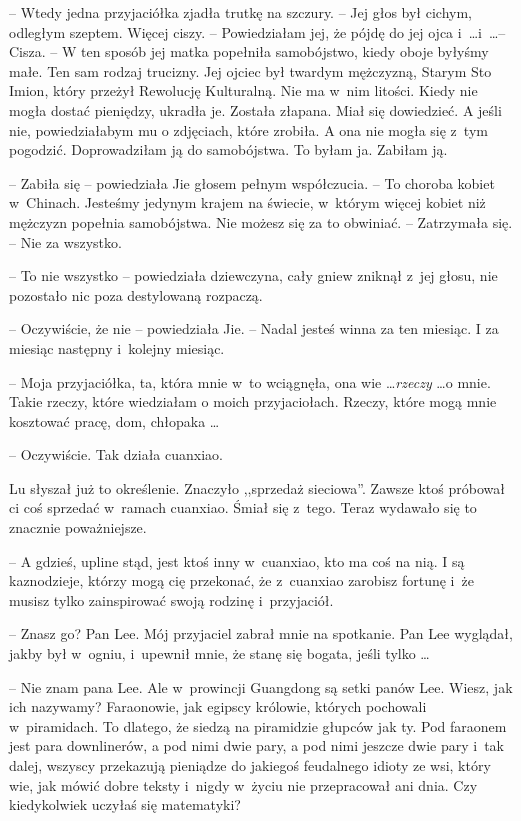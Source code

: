 \documentclass[oneside,polish,11pt,rmheadings]{mwbk}
\begin{document}
-- Wtedy jedna przyjaciółka zjadła trutkę na szczury. -- Jej głos był cichym, odległym szeptem. Więcej ciszy. -- Powiedziałam jej, że pójdę do jej ojca i~\ldots  i~\ldots  -- Cisza. -- W ten sposób jej matka popełniła samobójstwo, kiedy oboje byłyśmy małe. Ten sam rodzaj trucizny. Jej ojciec był twardym mężczyzną, Starym Sto Imion, który przeżył Rewolucję Kulturalną. Nie ma w~nim litości. Kiedy nie mogła dostać pieniędzy, ukradła je. Została złapana. Miał się dowiedzieć. A jeśli nie, powiedziałabym mu o zdjęciach, które zrobiła. A ona nie mogła się z~tym pogodzić. Doprowadziłam ją do samobójstwa. To byłam ja. Zabiłam ją.

-- Zabiła się -- powiedziała Jie głosem pełnym współczucia. -- To choroba kobiet w~Chinach. Jesteśmy jedynym krajem na świecie, w~którym więcej kobiet niż mężczyzn popełnia samobójstwa. Nie możesz się za to obwiniać. -- Zatrzymała się. -- Nie za wszystko.

-- To nie wszystko -- powiedziała dziewczyna, cały gniew zniknął z~jej głosu, nie pozostało nic poza destylowaną rozpaczą.

-- Oczywiście, że nie -- powiedziała Jie. -- Nadal jesteś winna za ten miesiąc. I za miesiąc następny i~kolejny miesiąc.

-- Moja przyjaciółka, ta, która mnie w~to wciągnęła, ona wie \ldots  \textit{rzeczy} \ldots  o mnie. Takie rzeczy, które wiedziałam o moich przyjaciołach. Rzeczy, które mogą mnie kosztować pracę, dom, chłopaka \ldots  

-- Oczywiście. Tak działa cuanxiao. 

Lu słyszał już to określenie. Znaczyło ,,sprzedaż sieciowa''. Zawsze ktoś próbował ci coś sprzedać w~ramach cuanxiao. Śmiał się z~tego. Teraz wydawało się to znacznie poważniejsze. 

-- A gdzieś, upline stąd, jest ktoś inny w~cuanxiao, kto ma coś na nią. I są kaznodzieje, którzy mogą cię przekonać, że z~cuanxiao zarobisz fortunę i~że musisz tylko zainspirować swoją rodzinę i~przyjaciół.

-- Znasz go? Pan Lee. Mój przyjaciel zabrał mnie na spotkanie. Pan Lee wyglądał, jakby był w~ogniu, i~upewnił mnie, że stanę się bogata, jeśli tylko \ldots 

-- Nie znam pana Lee. Ale w~prowincji Guangdong są setki panów Lee. Wiesz, jak ich nazywamy? Faraonowie, jak egipscy królowie, których pochowali w~piramidach. To dlatego, że siedzą na piramidzie głupców jak ty. Pod faraonem jest para downlinerów, a pod nimi dwie pary, a pod nimi jeszcze dwie pary i~tak dalej, wszyscy przekazują pieniądze do jakiegoś feudalnego idioty ze wsi, który wie, jak mówić dobre teksty i~nigdy w~życiu nie przepracował ani dnia. Czy kiedykolwiek uczyłaś się matematyki?
\end{document}
